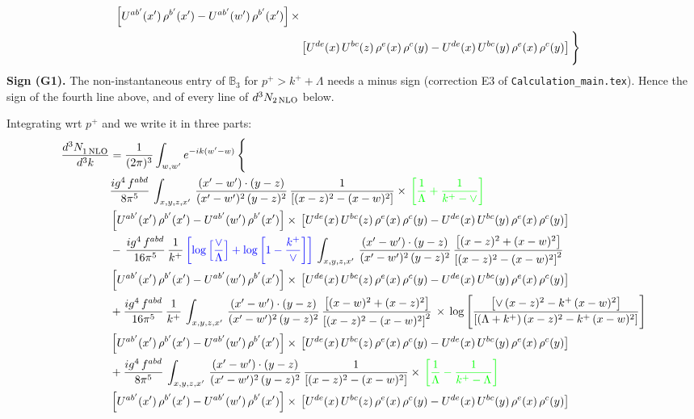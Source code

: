 \documentclass[9pt]{article}
\numberwithin{equation}{section}
\begin{document}
\begin{align}
\left[U^{ab'}(x')\,\rho^{b'}(x')-U^{ab'}(w')\, \rho^{b'}(x')\right]\times\notag \\ & \left[U^{de}(x)\,U^{bc}(z)\, \rho^{e}(x)\,\rho^{c}(y)-U^{de}(x)\,U^{bc}(y)\,\rho^{e}(x)\,\rho^{c}(y)\right]\Bigg\}
\end{align}
\begingroup\color{blue}\noindent\textbf{Sign (G1).} The non-instantaneous entry of $\mathbb{B}_{3}$ for $p^{+}>k^{+}+\Lambda$ needs a minus sign (correction E3 of \texttt{Calculation\_main.tex}). Hence the sign of the fourth line above, and of every line of $d^{3}N_{2\,\rm NLO}$ below.\par\endgroup
Integrating wrt $p^{+}$ and we write it in three parts:
\begin{align}
   \frac{d^{3}N_{1\,\rm NLO}^{\rm}}{d^{3}k}  & = \frac{1}{(2\pi)^{3}}  \int_{w, w^\prime} e^{-ik(w^\prime-w)}\, \Bigg\{\notag \\ & \frac{ig^{4}\,f^{abd}}{8\pi^{5}}\,\int_{x,y,z,x'}\, \frac{(x'-w')\cdot (y-z)}{(x'-w')^{2}\,(y-z)^{2}}\, \frac{1}{\left[(x-z)^{2}-(x-w)^{2}\right]}\times\, {\color{green}\left[\frac{1}{\Lambda}+\frac{1}{k^{+}-\vee}\right]}\notag \\ & \left[U^{ab'}(x')\,\rho^{b'}(x')-U^{ab'}(w')\, \rho^{b'}(x')\right]\times\, \left[U^{de}(x)\,U^{bc}(z)\, \rho^{e}(x)\,\rho^{c}(y)-U^{de}(x)\,U^{bc}(y)\,\rho^{e}(x)\,\rho^{c}(y)\right]\notag \\ & -\,\frac{ig^{4}\,f^{abd}}{16\pi^{5}}\,\frac{1}{k^{+}}\,{\color{blue}\left[\log{\left[\frac{\vee}{\Lambda}\right]} + \log{\left[1-\frac{k^{+}}{\vee}\right]}\right]}\,\int_{x,y,z,x'}\, \frac{(x'-w')\cdot (y-z)}{(x'-w')^{2}\,(y-z)^{2}}\,\frac{\left[(x-z)^{2}+(x-w)^{2}\right]}{\left[(x-z)^{2}-(x-w)^{2}\right]^{2}}\notag \\ & \left[U^{ab'}(x')\,\rho^{b'}(x')-U^{ab'}(w')\, \rho^{b'}(x')\right]\times\, \left[U^{de}(x)\,U^{bc}(z)\, \rho^{e}(x)\,\rho^{c}(y)-U^{de}(x)\,U^{bc}(y)\,\rho^{e}(x)\,\rho^{c}(y)\right]\notag \\ &  +\frac{ig^{4}\,f^{abd}}{16\pi^{5}}\, \frac{1}{k^{+}}\,\int_{x,y,z,x'}\, \frac{(x'-w')\cdot (y-z)}{(x'-w')^{2}\,(y-z)^{2}}\, \frac{\left[(x-w)^{2}+(x-z)^{2}\right]}{\left[(x-z)^{2}-(x-w)^{2}\right]^{2}}\, \times\, \log{\left[\frac{\left[\vee\, (x-z)^{2} - k^{+}\, (x-w)^{2}\right]}{\left[(\Lambda + k^{+})\, (x-z)^{2} - k^{+}\, (x-w)^{2}\right]}\right]}\notag \\ & \left[U^{ab'}(x')\,\rho^{b'}(x')-U^{ab'}(w')\, \rho^{b'}(x')\right]\times\, \left[U^{de}(x)\,U^{bc}(z)\, \rho^{e}(x)\,\rho^{c}(y)-U^{de}(x)\,U^{bc}(y)\,\rho^{e}(x)\,\rho^{c}(y)\right]\notag \\ &  + \frac{ig^{4}\,f^{abd}}{8\pi^{5}}\,\int_{x,y,z,x'}\, \frac{(x'-w')\cdot (y-z)}{(x'-w')^{2}\,(y-z)^{2}}\, \frac{1}{\left[(x-z)^{2}-(x-w)^{2}\right]}\times\, {\color{green}\left[\frac{1}{\Lambda}-\frac{1}{k^{+}-\Lambda}\right]}\notag \\ & \left[U^{ab'}(x')\,\rho^{b'}(x')-U^{ab'}(w')\, \rho^{b'}(x')\right]\times\, \left[U^{de}(x)\,U^{bc}(z)\, \rho^{e}(x)\,\rho^{c}(y)-U^{de}(x)\,U^{bc}(y)\,\rho^{e}(x)\,\rho^{c}(y)\right]\notag \\ & 
\end{align}
\end{document}
